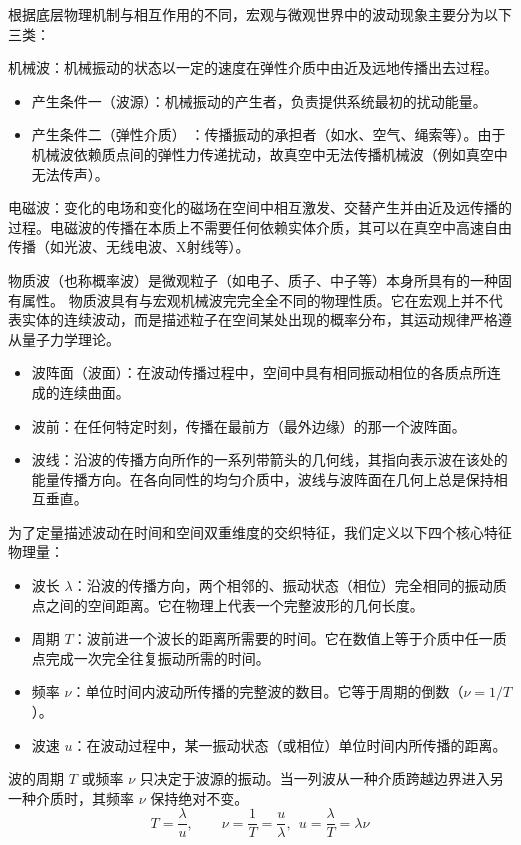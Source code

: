 \documentclass[lang=cn,11pt]{elegantbook}
\begin{document}
根据底层物理机制与相互作用的不同，宏观与微观世界中的波动现象主要分为以下三类：

\begin{definition}
机械波：机械振动的状态以一定的速度在弹性介质中由近及远地传播出去过程。
\begin{itemize}
    \item 产生条件一（波源）：机械振动的产生者，负责提供系统最初的扰动能量。
    \item 产生条件二（弹性介质） ：传播振动的承担者（如水、空气、绳索等）。由于机械波依赖质点间的弹性力传递扰动，故真空中无法传播机械波（例如真空中无法传声）。
\end{itemize}
电磁波：变化的电场和变化的磁场在空间中相互激发、交替产生并由近及远传播的过程。电磁波的传播在本质上不需要任何依赖实体介质，其可以在真空中高速自由传播（如光波、无线电波、X射线等）。

物质波（也称概率波）是微观粒子（如电子、质子、中子等）本身所具有的一种固有属性。 物质波具有与宏观机械波完完全全不同的物理性质。它在宏观上并不代表实体的连续波动，而是描述粒子在空间某处出现的概率分布，其运动规律严格遵从量子力学理论。
\end{definition}

\begin{definition}
\begin{itemize}
\item 波阵面（波面）：在波动传播过程中，空间中具有相同振动相位的各质点所连成的连续曲面。
\item 波前：在任何特定时刻，传播在最前方（最外边缘）的那一个波阵面。
\item 波线：沿波的传播方向所作的一系列带箭头的几何线，其指向表示波在该处的能量传播方向。在各向同性的均匀介质中，波线与波阵面在几何上总是保持相互垂直。
\end{itemize}
为了定量描述波动在时间和空间双重维度的交织特征，我们定义以下四个核心特征物理量：
\begin{itemize}
\item 波长 $\lambda$：沿波的传播方向，两个相邻的、振动状态（相位）完全相同的振动质点之间的空间距离。它在物理上代表一个完整波形的几何长度。
\item 周期 $T$：波前进一个波长的距离所需要的时间。它在数值上等于介质中任一质点完成一次完全往复振动所需的时间。
\item 频率 $\nu$：单位时间内波动所传播的完整波的数目。它等于周期的倒数（$\nu = 1/T$）。
\item 波速 $u$：在波动过程中，某一振动状态（或相位）单位时间内所传播的距离。
\end{itemize}
波的周期 $T$ 或频率 $\nu$ 只决定于波源的振动。当一列波从一种介质跨越边界进入另一种介质时，其频率 $\nu$ 保持绝对不变。
$$T = \frac{\lambda}{u}, \qquad \nu = \frac{1}{T} = \frac{u}{\lambda},~~\boxed{u = \frac{\lambda}{T} = \lambda \nu}$$
\end{definition}
\end{document}
